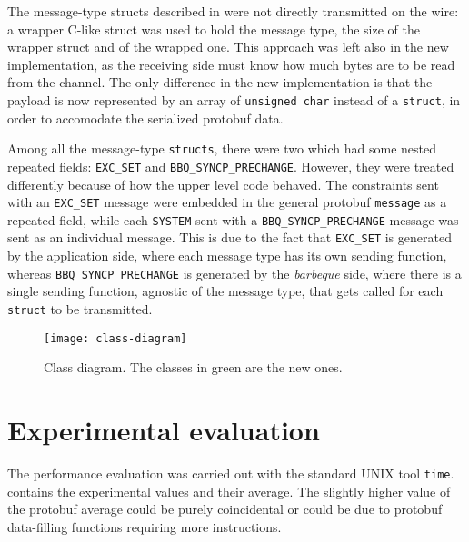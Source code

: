 The message-type structs described in  were not directly transmitted on the wire: a wrapper C-like struct was used to hold the message type, the size of the wrapper struct and of the wrapped one. This approach was left also in the new implementation, as the receiving side must know how much bytes are to be read from the channel. The only difference in the new implementation is that the payload is now represented by an array of \texttt{unsigned char} instead of a \texttt{struct}, in order to accomodate the serialized protobuf data.

Among all the message-type \texttt{structs}, there were two which had some nested repeated fields: \texttt{EXC\_SET} and \texttt{BBQ\_SYNCP\_PRECHANGE}. However, they were treated differently because of how the upper level code behaved. The constraints sent with an \texttt{EXC\_SET} message were embedded in the general protobuf \texttt{message} as a repeated field, while each \texttt{SYSTEM} sent with a \texttt{BBQ\_SYNCP\_PRECHANGE} message was sent as an individual message. This is due to the fact that \texttt{EXC\_SET} is generated by the application side, where each message type has its own sending function, whereas \texttt{BBQ\_SYNCP\_PRECHANGE} is generated by the \emph{barbeque} side, where there is a single sending function, agnostic of the message type, that gets called for each \texttt{struct} to be transmitted.

\begin{figure}[ht]
    \centering
    \texttt{[image: class-diagram]}
    \caption{Class diagram. The classes in green are the new ones.}
    \label{fig:class-diagram}
\end{figure}

\newpage
\section{Experimental evaluation}

The performance evaluation was carried out with the standard UNIX tool \texttt{time}.  contains the experimental values and their average. The slightly higher value of the protobuf average could be purely coincidental or could be due to protobuf data-filling functions requiring more instructions.

